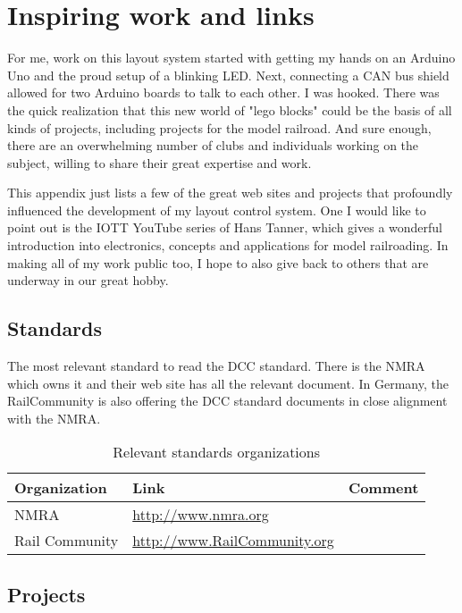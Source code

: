 \chapter{Inspiring work and links}

For me, work on this layout system started with getting my hands on an Arduino Uno and the proud setup of a blinking LED. Next, connecting a CAN bus shield allowed for two Arduino boards to talk to each other. I was hooked. There was the quick realization that this new world of "lego blocks" could be the basis of all kinds of projects, including projects for the model railroad. And sure enough, there are an overwhelming number of clubs and individuals working on the subject, willing to share their great expertise and work. 

This appendix just lists a few of the great web sites and projects that profoundly influenced the development of my layout control system. One I would like to point out is the IOTT YouTube series of Hans Tanner, which gives a wonderful introduction into electronics, concepts and applications for model railroading. In making all of my work public too, I hope to also give back to others that are underway in our great hobby.

\section{Standards}

The most relevant standard to read the DCC standard. There is the NMRA which owns it and their web site has all the relevant document. In Germany, the RailCommunity is also offering the DCC standard documents in close alignment with the NMRA.

\begin{table}[h!]
\centering
\begin{tabularx}{\textwidth}{lXl}
\toprule
\textbf{Organization} & \textbf{Link} & \textbf{Comment} \\
\midrule
NMRA & \url{http://www.nmra.org} & \\
\midrule
Rail Community & \url{http://www.RailCommunity.org} & \\
\bottomrule
\end{tabularx}
\caption{Relevant standards organizations}
\label{tab:standards}
\end{table}

\section{Projects}

